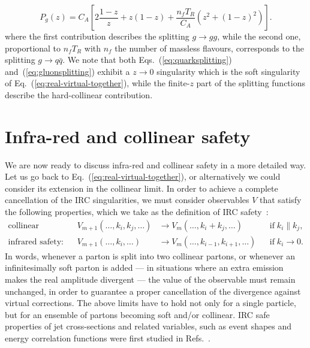  \begin{equation}\label{eq:gluonsplitting}
  P_g (z)=C_A \left[ 2\frac{1-z}{z}+z(1-z)+\frac{n_f T_R}{C_A}\left(z^2+(1-z)^2\right)
 \right].
 \end{equation}
 where the first contribution describes the splitting $g \to gg$,
 while the second one, proportional to $n_fT_R$ with $n_f$ the number
 of massless flavours, corresponds to the splitting $g \to q \bar q$.
 We note that both Eqs.~(\ref{eq:quarksplitting})
 and~(\ref{eq:gluonsplitting}) exhibit a $z \to 0$ singularity which
 is the soft singularity of Eq.~(\ref{eq:real-virtual-together}),
 while the finite-$z$ part of the splitting functions describe the
 hard-collinear contribution.

 \section{Infra-red and collinear safety}\label{sec:IRC-safety}


We are now ready to discuss infra-red and collinear safety in a more detailed way. Let us go back to Eq.~(\ref{eq:real-virtual-together}), or alternatively we could consider its extension in the collinear limit.  In order to achieve a complete cancellation of the IRC singularities, we must consider observables $V$ that satisfy the following properties, which we take as the definition of IRC safety~\cite{Sterman:1977wj}:
\begin{align}
\text{collinear safety:}&&
V_{m+1}\left(\ldots,k_i,k_j,\ldots\right)&\longrightarrow V_{m}\left(\ldots,k_i+k_j,\ldots\right) &&\mathrm{if}\;k_i\parallel k_j ,\\
\text{infrared safety:}&&
V_{m+1}\left(\ldots,k_i,\ldots\right)&\longrightarrow V_{m}\left(\ldots,k_{i-1},k_{i+1},\ldots\right) &&\mathrm{if}\;k_i\to 0.
\end{align}
In words, whenever a parton is split into two collinear partons, or
whenever an infinitesimally soft parton is added --- \ie in situations
where an extra emission makes the real amplitude divergent --- the value
of the observable must remain unchanged, in order to guarantee a
proper cancellation of the divergence against virtual corrections.
%
The above limits have to hold not only for a single particle, but for an ensemble of partons becoming soft and/or collinear.
IRC safe properties of jet cross-sections and related variables, such as event shapes and energy correlation functions were first studied in Refs.~\cite{Sterman:1978bi,Sterman:1978bj,Sterman:1979uw}.
%


